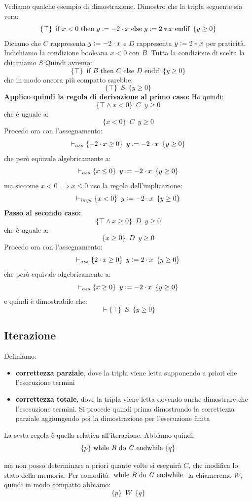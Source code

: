 \begin{esempio}
	Vediamo qualche esempio di dimostrazione. Dimostro che la tripla seguente sia
	vera:
	\[\{\top\}\,\,\,\mbox{if } x<0 \mbox{ then }y\cceq -2\cdot x \mbox{ else }
		y\cceq 2*x\mbox{ endif}\,\,\,\{y\geq 0\}\]
		Diciamo che $C$ rappresenta $y\cceq -2\cdot x$ e $D$ rappresenta $y\cceq 2*x$
		per praticità. Indichiamo la condizione booleana $x<0$ con $B$. Tutta la
		condizione di scelta la chiamiamo $S$
		Quindi avremo:
		\[\{\top\}\,\,\,\mbox{if } B \mbox{ then }C\mbox{ else }
			D \mbox{ endif}\,\,\,\{y\geq 0\}\]
			che in modo ancora più compatto sarebbe:
			\[\{\top\}\,\,\, S\,\,\,\{y\geq 0\}\]
			\textbf{Applico quindi la regola di derivazione al primo caso:}
			Ho quindi:
			\[\{\top \land x<0\}\,\,\, C\,\,\,{y\geq 0}\]
			che è uguale a:
			\[\{x<0\}\,\,\, C\,\,\,{y\geq 0}\]
			Procedo ora con l'assegnamento:
			\[\vdash_{ass}\{-2\cdot x\geq 0\}\,\,\, y\cceq -2\cdot x\,\,\,\{y\geq 0\}\]
			che però equivale algebricamente a:
			\[\vdash_{ass}\{x\leq 0\}\,\,\, y\cceq -2\cdot x\,\,\,\{y\geq 0\}\]
			ma siccome $x<0 \implies x\leq 0$ uso la regola dell'implicazione:
			\[\vdash_{impl}\{x< 0\}\,\,\, y\cceq -2\cdot x\,\,\,\{y\geq 0\}\]
			\textbf{Passo al secondo caso:}
			\[\{\top \land x\geq 0\}\,\,\, D\,\,\,{y\geq 0}\]
			che è uguale a:
			\[\{x\geq 0\}\,\,\, D\,\,\,{y\geq 0}\]
			Procedo ora con l'assegnamento:
			\[\vdash_{ass}\{2\cdot x\geq 0\}\,\,\, y\cceq 2\cdot x\,\,\,\{y\geq 0\}\]
			che però equivale algebricamente a:
			\[\vdash_{ass}\{x\geq 0\}\,\,\, y\cceq -2\cdot x\,\,\,\{y\geq 0\}\]
			e quindi è dimostrabile che:
			\[\vdash \{\top\}\,\,\, S\,\,\,\{y\geq 0\}\]
			\end{esempio}
			\subsection{Iterazione}
			\begin{definizione}
				Definiamo:
				\begin{itemize}
					\item \textbf{correttezza parziale}, dove la tripla viene letta supponendo a
					      priori che l'esecuzione termini
					\item \textbf{correttezza totale}, dove la tripla viene letta dovendo anche
					      dimostrare che l'esecuzione termini. Si procede quindi prima dimostrando la
					      correttezza parziale aggiungendo poi la dimostrazione per l'esecuzione
					      finita
				\end{itemize}
			\end{definizione}
			\begin{definizione}
				La sesta regola è quella relativa all'iterazione. Abbiamo quindi:
				\[\{p\}\mbox{ while \textit{B} do \textit{C} endwhile }\{q\}\]
			\end{definizione}
			ma non posso determinare a priori quante volte si eseguirà $C$, che modifica
			lo stato della memoria. Per comodità $\mbox{ while \textit{B} do \textit{C}
			endwhile }$ la chiameremo $W$, quindi in modo compatto abbiamo:
			\[\{p\}\,\,\, W\,\,\,\{q\}\]
